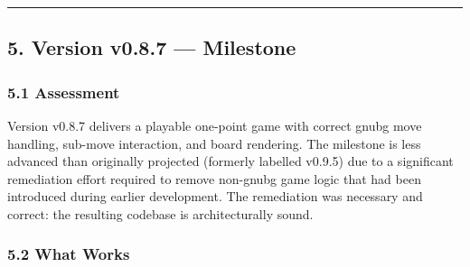 \documentclass[11pt,a4paper]{article}
\begin{document}
\begin{center}\rule{0.5\linewidth}{0.5pt}\end{center}

\subsection{5. Version v0.8.7 --- Milestone}\label{version-v085}

\subsubsection{5.1 Assessment}\label{assessment-v085}

Version v0.8.7 delivers a playable one-point game with correct gnubg
move handling, sub-move interaction, and board rendering. The milestone
is less advanced than originally projected (formerly labelled v0.9.5)
due to a significant remediation effort required to remove non-gnubg game
logic that had been introduced during earlier development. The remediation
was necessary and correct: the resulting codebase is architecturally
sound.

\subsubsection{5.2 What Works}\label{what-works-v085}
\end{document}
